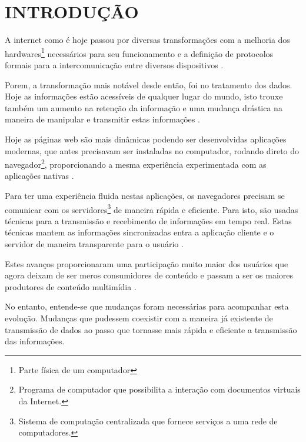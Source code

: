 \section{INTRODUÇÃO}

A internet como é hoje passou por diversas transformações com a melhoria dos hardwares\footnote{Parte física de um computador} necessários para seu funcionamento e a definição de protocolos formais para a intercomunicação entre diversos dispositivos \cite{Aghaei2012}.

Porem, a transformação mais notável desde então, foi no tratamento dos dados. Hoje as informações estão acessíveis de qualquer lugar do mundo, isto trouxe também um aumento na retenção da informação e uma mudança drástica na maneira de manipular e transmitir estas informações \cite{Leiner2009}.

Hoje as páginas web são mais dinâmicas podendo ser desenvolvidas aplicações modernas, que antes precisavam ser instaladas no computador, rodando direto do navegador\footnote{Programa de computador que possibilita a interação com documentos virtuais da Internet.},  proporcionando a mesma experiência experimentada com as aplicações nativas \cite{Garrett2005}.

Para ter uma experiência fluida nestas aplicações, os navegadores precisam se comunicar com os servidores\footnote{Sistema de computação centralizada que fornece serviços a uma rede de computadores.} de maneira rápida e eficiente. Para isto, são usadas técnicas para a transmissão e recebimento de informações em tempo real. Estas técnicas mantem as informações sincronizadas entra a aplicação cliente e o servidor de maneira transparente para o usuário \cite{offutt2002quality}.

Estes avanços proporcionaram uma participação muito maior dos usuários que agora deixam de ser meros consumidores de conteúdo e passam a ser os maiores produtores de conteúdo multimídia \cite{Aghaei2012}.

No entanto, entende-se que mudanças foram necessárias para acompanhar esta evolução. Mudanças que pudessem coexistir com a maneira já existente de transmissão de dados ao passo que tornasse mais rápida e eficiente a transmissão das informações.